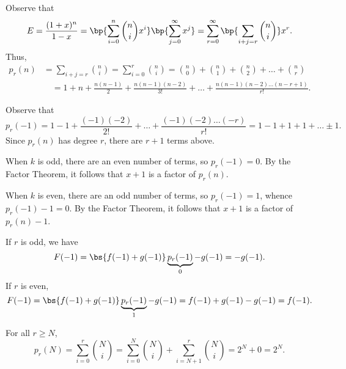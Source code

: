 \begin{solution}
    Observe that \[E = \frac{(1 + x)^n}{1 - x} = \bp{\sum_{i = 0}^n \binom{n}{i} x^i} \bp{\sum_{j = 0}^\infty x^j} = \sum_{r = 0}^\infty \bp{\sum_{i + j = r} \binom{n}{i}} x^r.\] Thus,
    \begin{align*}
        p_r(n) &= \sum_{i + j = r} \binom{n}{i} = \sum_{i = 0}^r \binom{n}{i} = \binom{n}{0} + \binom{n}{1} + \binom{n}{2} + \dots + \binom{n}{r}\\
        &\hspace{1em}= 1 + n + \frac{n(n-1)}{2} + \frac{n(n-1)(n-2)}{3!} + \dots + \frac{n(n-1)(n-2)\dots(n-r+1)}{r!}.
    \end{align*}

    Observe that \[p_r(-1) = 1 - 1 + \frac{(-1)(-2)}{2!} + \dots + \frac{(-1)(-2)\dots(-r)}{r!} = 1 - 1 + 1 + 1 + \dots \pm 1.\] Since $p_r(n)$ has degree $r$, there are $r+1$ terms above.

    \begin{ppart}
        When $k$ is odd, there are an even number of terms, so $p_r(-1) = 0$. By the Factor Theorem, it follows that $x+1$ is a factor of $p_r(n)$.
    \end{ppart}
    \begin{ppart}
        When $k$ is even, there are an odd number of terms, so $p_r(-1) = 1$, whence $p_r(-1) - 1 = 0$. By the Factor Theorem, it follows that $x+1$ is a factor of $p_r(n) - 1$.
    \end{ppart}
    \begin{ppart}
        If $r$ is odd, we have \[F(-1) = \bs{f(-1) + g(-1)} \underbrace{p_r(-1)}_{0} - g(-1) = -g(-1).\] If $r$ is even, \[F(-1) = \bs{f(-1) + g(-1)} \underbrace{p_r(-1)}_{1} - g(-1) = f(-1) + g(-1) - g(-1) = f(-1).\]
    \end{ppart}
    \begin{ppart}
        For all $r \geq N$, \[p_r(N) = \sum_{i = 0}^r \binom{N}{i} = \sum_{i = 0}^N \binom{N}{i} + \sum_{i = N+1}^r \binom{N}{i} = 2^N + 0 = 2^N.\]
    \end{ppart}
\end{solution}